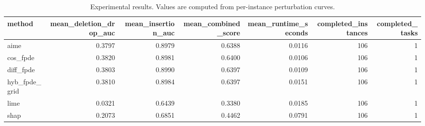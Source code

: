 \begin{table}[t]
\caption{Experimental results. Values are computed from per-instance perturbation curves.}
\label{tab:main_results_computed}
\centering
\begin{tabular}{lrrrrrr}
\toprule
method & mean\_deletion\_drop\_auc & mean\_insertion\_auc & mean\_combined\_score & mean\_runtime\_seconds & completed\_instances & completed\_tasks \\
\midrule
aime & 0.3797 & 0.8979 & 0.6388 & 0.0116 & 106 & 1 \\
cos\_fpde & 0.3820 & 0.8981 & 0.6400 & 0.0106 & 106 & 1 \\
diff\_fpde & 0.3803 & 0.8990 & 0.6397 & 0.0109 & 106 & 1 \\
hyb\_fpde\_grid & 0.3810 & 0.8984 & 0.6397 & 0.0151 & 106 & 1 \\
lime & 0.0321 & 0.6439 & 0.3380 & 0.0185 & 106 & 1 \\
shap & 0.2073 & 0.6851 & 0.4462 & 0.0791 & 106 & 1 \\
\bottomrule
\end{tabular}

\end{table}
